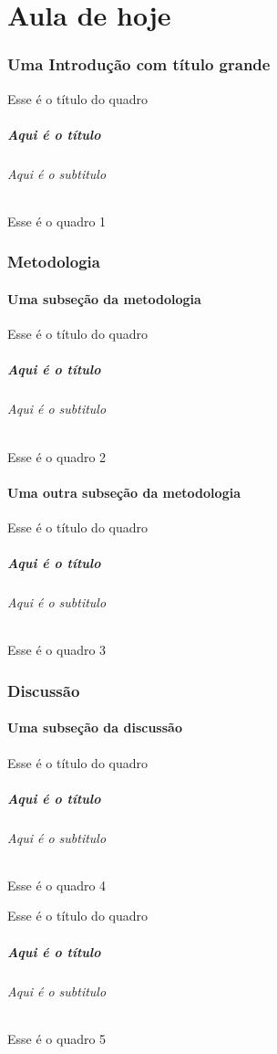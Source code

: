 \documentclass{beamer}
\begin{document}
	
	\part{Aula de hoje}
	\section[Introdução]{Uma Introdução com título grande}
	\begin{frame}{Esse é o título do quadro}
		\frametitle{Aqui é o título}
		\framesubtitle{Aqui é o subtitulo}
		Esse é o quadro 1
	\end{frame}
	
	\section{Metodologia}
	\subsection{Uma subseção da metodologia}
	\begin{frame}{Esse é o título do quadro}
		\frametitle{Aqui é o título}
		\framesubtitle{Aqui é o subtitulo}
		Esse é o quadro 2 %
	\end{frame}
	
	\subsection{Uma outra subseção da metodologia}
	\begin{frame}{Esse é o título do quadro}
		\frametitle{Aqui é o título}
		\framesubtitle{Aqui é o subtitulo}
		Esse é o quadro 3
	\end{frame}
	
	\section{Discussão}
	\subsection{Uma subseção da discussão}
	\begin{frame}{Esse é o título do quadro}
		\frametitle{Aqui é o título}
		\framesubtitle{Aqui é o subtitulo}
		Esse é o quadro 4 %
	\end{frame}
	
	\begin{frame}{Esse é o título do quadro}
		\frametitle{Aqui é o título}
		\framesubtitle{Aqui é o subtitulo}
		Esse é o quadro 5
	\end{frame}
	
\end{document}
